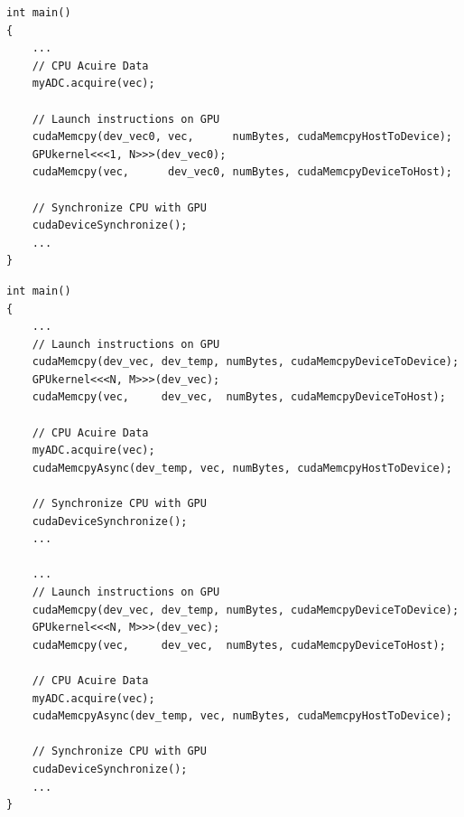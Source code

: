 \singlespacing
\clearpage
\begin{lstlisting}[style=myCUDAstyle,caption={Example code Simple example of the CPU acquiring data from myADC, copying from host to device, processing data on the device then copying from device to host. No processing occurs on device while CPU is acquiring data.},label={code:noPipe}]
int main()
{
	...
	// CPU Acuire Data
	myADC.acquire(vec);
	
	// Launch instructions on GPU 
	cudaMemcpy(dev_vec0, vec,      numBytes, cudaMemcpyHostToDevice);
	GPUkernel<<<1, N>>>(dev_vec0);
	cudaMemcpy(vec,      dev_vec0, numBytes, cudaMemcpyDeviceToHost);
	
	// Synchronize CPU with GPU
	cudaDeviceSynchronize();
	...
}
\end{lstlisting}
\doublespacing
\singlespacing
\begin{lstlisting}[style=myCUDAstyle,caption={Example code Simple of the CPU acquiring data from myADC, copying from host to device, processing data on the device then copying from device to host. No processing occurs on device while CPU is acquiring data.},label={code:pipe}]
int main()
{
	...
	// Launch instructions on GPU 
	cudaMemcpy(dev_vec, dev_temp, numBytes, cudaMemcpyDeviceToDevice);
	GPUkernel<<<N, M>>>(dev_vec);
	cudaMemcpy(vec,     dev_vec,  numBytes, cudaMemcpyDeviceToHost);
	
	// CPU Acuire Data
	myADC.acquire(vec);
	cudaMemcpyAsync(dev_temp, vec, numBytes, cudaMemcpyHostToDevice);
	
	// Synchronize CPU with GPU
	cudaDeviceSynchronize();
	...
	
	...
	// Launch instructions on GPU 
	cudaMemcpy(dev_vec, dev_temp, numBytes, cudaMemcpyDeviceToDevice);
	GPUkernel<<<N, M>>>(dev_vec);
	cudaMemcpy(vec,     dev_vec,  numBytes, cudaMemcpyDeviceToHost);
	
	// CPU Acuire Data
	myADC.acquire(vec);
	cudaMemcpyAsync(dev_temp, vec, numBytes, cudaMemcpyHostToDevice);
	
	// Synchronize CPU with GPU
	cudaDeviceSynchronize();
	...
}
\end{lstlisting}
\doublespacing

\clearpage
